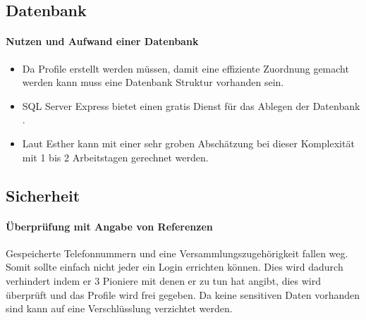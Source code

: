 \subsection{Datenbank}
\paragraph{Nutzen und Aufwand einer Datenbank}\begin{itemize}
\item Da Profile erstellt werden müssen, damit eine effiziente Zuordnung gemacht werden kann muss eine Datenbank Struktur vorhanden sein.
\item SQL Server Express bietet einen gratis Dienst für das Ablegen der Datenbank \cite{SQL}.
\item Laut Esther kann mit einer sehr groben Abschätzung bei dieser Komplexität mit 1 bis 2 Arbeitstagen gerechnet werden.
\end{itemize}

\subsection{Sicherheit}
\paragraph{Überprüfung mit Angabe von Referenzen} Gespeicherte Telefonnummern und eine Versammlungszugehörigkeit fallen weg. Somit sollte einfach nicht jeder ein Login errichten können. Dies wird dadurch verhindert indem er 3 Pioniere mit denen er zu tun hat angibt, dies wird überprüft und das Profile wird frei gegeben. Da keine sensitiven Daten vorhanden sind kann auf eine Verschlüsslung verzichtet werden.